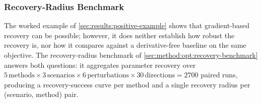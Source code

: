 %
%
%

\subsubsection{Recovery-Radius Benchmark}\label{sec:results:baseline}
The worked example of \cref{sec:results:positive-example} shows that gradient-based recovery can be possible;
however, it does neither establish how robust the recovery is, nor how it compares against a derivative-free baseline on the same objective.
The recovery-radius benchmark of \cref{sec:method:opt:recovery-benchmark} answers both questions:
it aggregates parameter recovery over $5\,\text{methods}\times 3\,\text{scenarios}\times 6\,\text{perturbations}\times 30\,\text{directions}=2700$ paired runs,
producing a recovery-success curve per method and a single recovery radius per (scenario, method) pair.

